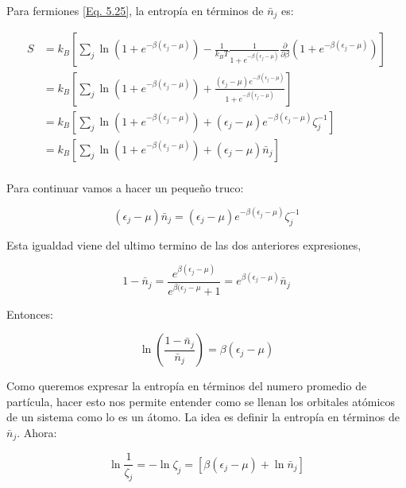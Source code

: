 \documentclass[11pt,fleqn]{book}
\begin{document}
Para fermiones \ref{Eq. 5.25}, la entropía en términos de $\bar{n}_{j}$ es:

\begin{equation*}
    \begin{split}
        S&=k_{B}\left[\sum_{j}\ln(1+e^{-\beta(\epsilon_{j}-\mu)})-\frac{1}{k_{B}T}\frac{1}{1+e^{-\beta(\epsilon_{j}-\mu)}}\frac{\partial}{\partial \beta}(1+e^{-\beta(\epsilon_{j}-\mu)})\right]\\
        &=k_{B}\left[\sum_{j}\ln(1+e^{-\beta(\epsilon_{j}-\mu)})+\frac{(\epsilon_{j}-\mu)e^{-\beta(\epsilon_{j}-\mu)}}{1+e^{-\beta(\epsilon_{j}-\mu)}}\right]\\
        &=k_{B}\left[\sum_{j}\ln(1+e^{-\beta(\epsilon_{j}-\mu)})+(\epsilon_{j}-\mu)e^{-\beta(\epsilon_{j}-\mu)}\zeta_{j}^{-1}\right]\\
        &=k_{B}\left[\sum_{j}\ln(1+e^{-\beta(\epsilon_{j}-\mu)})+(\epsilon_{j}-\mu)\bar{n}_{j}\right]\\
    \end{split}
\end{equation*}

Para continuar vamos a hacer un pequeño truco:

\begin{equation*}
    (\epsilon_{j}-\mu)\bar{n}_{j}=(\epsilon_{j}-\mu)e^{-\beta(\epsilon_{j}-\mu)}\zeta_{j}^{-1}
\end{equation*}

Esta igualdad viene del ultimo termino de las dos anteriores expresiones,

\begin{equation*}
    1-\bar{n}_{j}=\frac{e^{\beta(\epsilon_{j}-\mu)}}{e^{\beta(\epsilon_{j}-\mu}+1}=e^{\beta(\epsilon_{j}-\mu)}\bar{n}_{j}
\end{equation*}

Entonces:

\begin{equation*}
    \ln{\left(\frac{1-\bar{n}_{j}}{\bar{n}_{j}}\right)}=\beta(\epsilon_{j}-\mu)
\end{equation*}

Como queremos expresar la entropía en términos del numero promedio de partícula, hacer esto nos permite entender como se llenan los orbitales atómicos de un sistema como lo es un átomo. La idea es definir la entropía en términos de $\bar{n}_{j}$.  Ahora:

\begin{equation}
    \ln{\frac{1}{\zeta_{j}}}=-\ln{\zeta_{j}}=\left[\beta(\epsilon_{j}-\mu)+\ln{\bar{n}_{j}}\right]
\end{equation}
\end{document}
